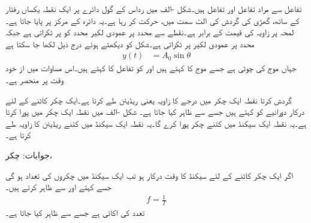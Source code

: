 
 تفاعل سے مراد  تفاعل  اور  تفاعل  ہیں۔شکل -الف میں رداس  کے گول دائرے پر ایک نقطہ یکساں رفتار کے ساتھ، گھڑی کی گردش کی الٹ سمت میں، حرکت کر رہا ہے۔یہ دائرہ  کے مرکز  پر پایا جاتا ہے۔لمحہ  پر زاویہ  کی قیمت  کے برابر ہے۔نقطے سے  محدد پر عمودی لکیر محدد کو    پر ٹکراتی ہے جبکہ  محدد پر عمودی لکیر  پر ٹکراتی ہے۔شکل کو دیکھتے ہوئے درج ذیل لکھا جا سکتا ہے
\begin{align}\label{مساوات_بدلتا_سائن_نما_تفاعل_الف}
y(t)&=A_0 \sin \theta
\end{align}
جہاں  موج کی چوٹی ہے جسے موج کا  کہتے ہیں اور  کو تفاعل کا  کہتے ہیں۔اس مساوات میں  از خود وقت پر منحصر ہے۔

 گردش کرتا نقطہ ایک چکر میں  درجے کا زاویہ یعنی  ریڈیئن طے کرتا ہے۔ایک چکر کاٹنے کے لئے درکار دورانیے کو  کہتے ہیں جسے  سے ظاہر کیا جاتا ہے۔
شکل -الف میں نقطہ ایک چکر  میں پورا کرتا ہے۔یہ نقطہ ایک سیکنڈ میں کتنے چکر پورا کرے گا۔یہ نقطہ ایک سیکنڈ میں کتنے ریڈیئن کا زاویہ طے کرتا ہے۔

جوابات: چکر، 

اگر ایک چکر کاٹنے کے لئے  سیکنڈ کا وقت درکار ہو تب ایک سیکنڈ میں چکروں کی تعداد   ہو گی جسے  کہتے اور  سے ظاہر کرتے ہیں۔
\begin{align}
f=\frac{1}{T}
\end{align}
تعدد کی اکائی  ہے جسے  سے ظاہر کیا جاتا ہے۔

